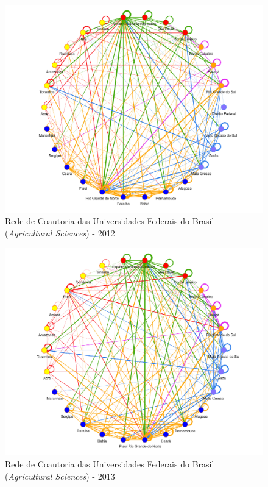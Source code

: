 \begin{figure}[H]
	\centering
	\includegraphics[width=\linewidth]{Imagens/rede-agr-br-2012.pdf}
	\caption{Rede de Coautoria das Universidades Federais do Brasil (\textit{Agricultural Sciences}) - 2012}
	\label{Rede de Coautoria - UF AGRI BR 2012}
\end{figure}

\begin{figure}[H]
	\centering
	\includegraphics[width=\linewidth]{Imagens/rede-agr-br-2013.pdf}
	\caption{Rede de Coautoria das Universidades Federais do Brasil (\textit{Agricultural Sciences}) - 2013}
	\label{Rede de Coautoria - UF AGRI BR 2013}
\end{figure}

